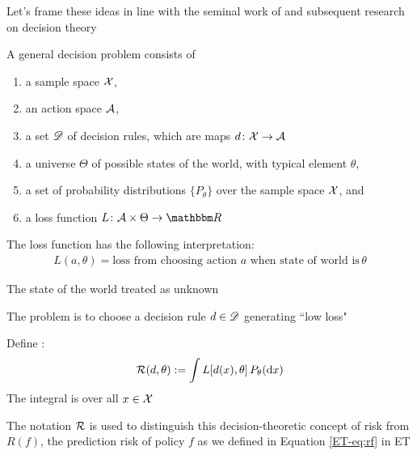\begin{frame}

    \vspace{2em}
    Let's frame these ideas in line with the seminal work of 
    \cite{wald1939contributions} and subsequent research on decision theory
    
    \vspace{.7em}
    A general decision problem consists of
    \begin{enumerate}
        \item a sample space $\mathcal X$,
        \item an action space $\mathcal A$,
        \item a set $\mathscr D$ of decision rules, which are maps $d \colon \mathcal X \to \mathcal A$
        \item a universe $\Theta$ of possible states of the world, with typical
            element $\theta$,
        \item a set of probability distributions $\{P_\theta\}$ over the sample
            space $\mathcal X$, and
        \item a loss function $L \colon \aA \times \Theta \to \RR$
    \end{enumerate}
\end{frame}

\begin{frame}

    \vspace{2em}
    The loss function has the following interpretation:
    \begin{align*}
        L(a, \theta) =  \text{loss from choosing action $a$ when state of world is} \,\theta
    \end{align*}
    
    \vspace{.7em}
    The state of the world treated as unknown
    
    The problem is to
    choose a decision rule $d \in \mathscr D$ generating ``low loss"
    
\end{frame}

\begin{frame}

    \vspace{2em}
    Define :
    \begin{equation*}
        \label{eq:waldrisk}
        \mathcal R(d, \theta) := \int L[d(x), \theta ] \, P_\theta(\mathop{}\!\mathrm{d} x)
    \end{equation*}
    The integral is over all $x \in \mathcal X$
    
     \vspace{.7em}
    The notation $\mathcal R$ is used to
    distinguish this decision-theoretic concept of risk from $R(f)$, the
    prediction risk of policy $f$ as we defined in Equation \eqref{ET-eq:rf} in ET
    
\end{frame}


